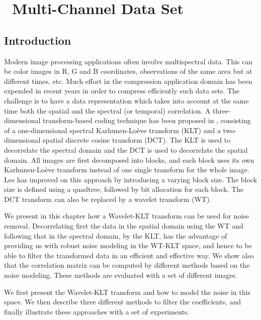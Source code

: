 
\chapter{ \ Multi-Channel Data Set}
\section{Introduction}

Modern image processing applications often involve multispectral data.
This can be color images in R, G and B coordinates, observations of the same 
area but at different times, etc. Much effort in the compression application
domain
has been expended in recent years in order to compress efficiently such
data sets. The challenge is to have a data representation which takes
into account at the same time both the spatial and the spectral 
(or temporal) correlation. A three-dimensional transform-based coding
technique has been proposed in \cite{mc:saghri95}, consisting of
a one-dimensional spectral Karhunen-Lo\`eve transform 
\cite{ima:karhunen47} (KLT)
and a two-dimensional spatial discrete cosine transform (DCT).
The KLT is used to decorrelate the spectral domain and the 
DCT is used to decorrelate the spatial domain.
All images are first decomposed into blocks, and each block uses its own
Karhunen-Lo\`eve transform instead of one single transform 
for the whole image.
Lee \cite{mc:lee99} has improved on this approach by introducing a varying
block size. The block size is defined using a quadtree, followed by 
bit allocation
for each block. The DCT transform can also be replaced by a wavelet 
transform \cite{mc:epstein92,mc:tretter95} (WT). 

We present in this chapter how a Wavelet-KLT transform can be used for
noise removal. Decorrelating first the data in the spatial domain using 
the WT and following that in the 
spectral domain, by the KLT, has the advantage of
providing us with robust noise modeling in the WT-KLT space, and hence to
be able 
to filter the transformed data in an efficient and effective 
way. We show also that
the correlation matrix can be computed by different methods based on  
the noise modeling. These methods are evaluated with a set of different 
images. 
 
We first present the Wavelet-KLT transform and how to model the 
noise in this space. We then describe three different methods to 
filter the coefficients, and finally illustrate these approaches with
 a set of experiments.

